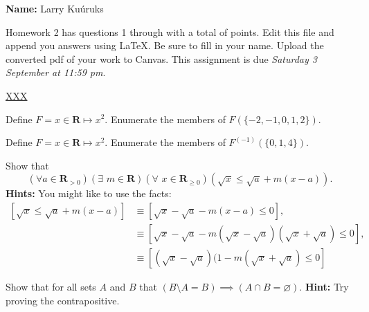 \documentclass[12pt,fleqn,answers]{exam}
\newcommand{\reals}{\mathbf{R}}
\newcommand{\intersection}{\cap}
\newcommand\PM{{\sc pm}}
\newcommand{\quiz}{2}
\newcommand{\term}{Fall}
\newcommand{\due}{Saturday 3 September at 11:59 \PM}
\begin{document}
\large
\vspace{0.1in}
\noindent{}
{\bf Name:} Larry Kuúruks  \\
\noindent \makebox[3.0truein][l]{\bf Homework \quiz, \term \/ \the\year}
\vspace{0.1in}

\begin{quote}
    \end{quote}
\noindent  Homework    \quiz\/  has questions 1 through  \numquestions \/ with a total of  \numpoints\/  points.   Edit this file and append you answers using La\TeX. Be sure to fill in your name. Upload the converted pdf of your work to Canvas.   This assignment is due \emph{\due}.

\vspace{0.1in}

\url{XXX}

\begin{questions} 

\question [5] Define $F = x \in \reals \mapsto x^2$. Enumerate
the members of $F(\{-2,-1,0,1,2 \})$.
\begin{solution}
\end{solution}

\question [5] Define $F = x \in \reals \mapsto x^2$. Enumerate
the members of $F^{(-1)} (\{0,1,4 \})$.

\begin{solution}
\end{solution}

\question[5] Show that
\begin{equation*}
 \left(\forall a \in \reals_{>0}\right) \left  (\exists \,\, m \in \reals \right )  \left (\forall \,\,
 x \in \reals_{\geq 0} \right ) \left (\sqrt{x} \leq \sqrt{a} + m (x-a) \right).
\end{equation*}
\textbf{Hints:} You might like to use the facts:
\begin{align*}
    \left[ \sqrt{x} \leq \sqrt{a} + m (x-a) \right] &\equiv
    \left[ \sqrt{x} - \sqrt{a} - m (x-a) \leq 0 \right], \\
    &\equiv  \left[ \sqrt{x} - \sqrt{a} - m  (\sqrt{x} - \sqrt{a}) 
          (\sqrt{x} + \sqrt{a}) \leq 0 \right], \\
    &\equiv \left[ (\sqrt{x} - \sqrt{a}) (1 - m  (\sqrt{x} + \sqrt{a}) \leq 0 \right]
\end{align*}

\begin{solution}
\end{solution}

\question [5] Show that for all sets $A$ and $B$ that $\left(B \setminus  A = B \right)  \implies \left( A \intersection B = \varnothing \right)$.
\textbf{Hint:} Try proving the contrapositive.

\begin{solution}
\end{solution}






\end{questions}
\end{document}
